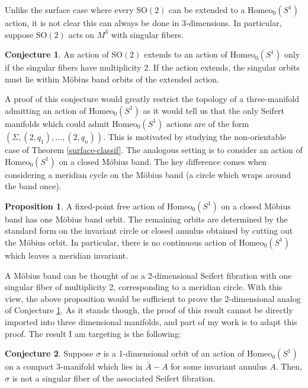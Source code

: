 \documentclass[10pt, oneside]{article}
\theoremstyle{definition}
\newtheorem{conj}{Conjecture}
\newtheorem{prop}{Proposition}
\theoremstyle{definition}
\begin{document}
Unlike the surface case where every $\text{SO}(2)$ can be extended to a $\text{Homeo}_0(S^1)$ action, it is not clear this can always be done in 3-dimensions. In particular, suppose $\text{SO}(2)$ acts on $M^3$ with singular fibers. 

\begin{conj}\label{singular-fiber-conj}
    An action of $\text{SO}(2)$ extends to an action of $\text{Homeo}_0(S^1)$ only if the singular fibers have multiplicity 2. If the action extends, the singular orbits must lie within M\"{o}bius band orbits of the extended action.
\end{conj}

A proof of this conjecture would greatly restrict the topology of a three-manifold admitting an action of $\text{Homeo}_0(S^1)$ as it would tell us that the only Seifert manifolds which could admit $\text{Homeo}_0(S^1)$ actions are of the form $(\Sigma, (2, q_1), \dots, (2, q_n))$. This is motivated by studying the non-orientable case of Theorem \ref{surface-classif}. The analogous setting is to consider an action of $\text{Homeo}_0(S^1)$ on a closed M\"{o}bius band. The key difference comes when considering a meridian cycle on the M\"{o}bius band (a circle which wraps around the band once).

\begin{prop}
A fixed-point free action of $\text{Homeo}_0(S^1)$ on a closed M\"{o}bius band has one M\"{o}bius band orbit. The remaining orbits are determined by the standard form on the invariant circle or closed annulus obtained by cutting out the M\"{o}bius orbit. In particular, there is no continuous action of $\text{Homeo}_0(S^1)$ which leaves a meridian invariant.
\end{prop}

A M\"{o}bius band can be thought of as a 2-dimensional Seifert fibration with one singular fiber of multiplicity 2, corresponding to a meridian circle. With this view, the above proposition would be sufficient to prove the 2-dimensional analog of Conjecture \ref{singular-fiber-conj}. As it stands though, the proof of this result cannot be directly imported into three dimensional manifolds, and part of my work is to adapt this proof. The result I am targeting is the following:

\begin{conj}\label{singular-fiber-invar-ann}
Suppose $\sigma$ is a 1-dimensional orbit of an action of $\text{Homeo}_0(S^1)$ on a compact 3-manifold which lies in $\bar{A}- A$ for some invariant annulus $A$. Then, $\sigma$ is not a singular fiber of the associated Seifert fibration. 
\end{conj}
\end{document}
